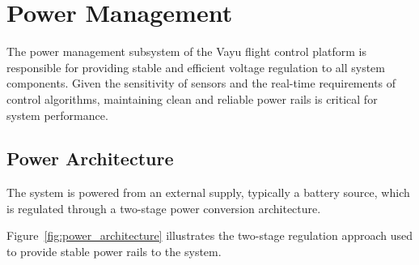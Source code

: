 \section{Power Management}
\label{sec:hw_power}

The power management subsystem of the Vayu flight control platform is responsible for providing stable and efficient voltage regulation to all system components. Given the sensitivity of sensors and the real-time requirements of control algorithms, maintaining clean and reliable power rails is critical for system performance.

\subsection{Power Architecture}

The system is powered from an external supply, typically a battery source, which is regulated through a two-stage power conversion architecture.

Figure~\ref{fig:power_architecture} illustrates the two-stage regulation approach used to provide stable power rails to the system.

